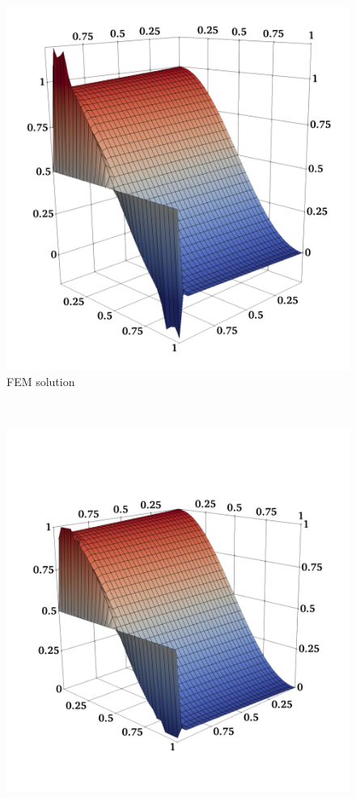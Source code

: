\documentclass[aspectratio=169,xcolor=dvipsnames,11pt]{beamer}
\begin{document}
\begin{frame}
\begin{figure}
\begin{minipage}{0.03\textwidth}
		\\[1.5em]
		~
	\end{minipage}%
	~~~
	\begin{minipage}{0.3\textwidth}
	\small
		\centering
		\includegraphics[width=\linewidth]{Figures/advection_diffusion_u_h.png}
		\\
		FEM solution
	\end{minipage}%
	~
	\begin{minipage}{0.3\textwidth}
	\small
		\centering
		\includegraphics[width=\linewidth]{Figures/advection_diffusion_utilde.png}

\end{minipage}
\end{figure}
\end{frame}
\end{document}
